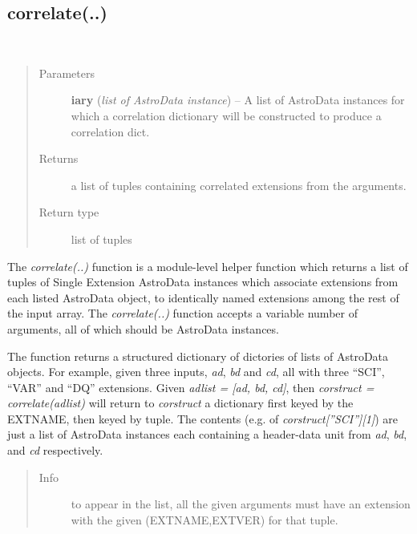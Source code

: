 \documentclass[letterpaper,10pt,english]{sphinxmanual}
\begin{document}
\subsection{correlate(..)}
\label{chapter_AstroDataClass:correlate}

\begin{fulllineitems}
\label{chapter_AstroDataClass:astrodata.data.correlate}~\begin{quote}\begin{description}
\item[{Parameters}] \leavevmode
\textbf{iary} (\emph{list of AstroData instance}) -- A list of AstroData instances for which a correlation dictionary
will be constructed to produce a correlation dict.

\item[{Returns}] \leavevmode
a list of tuples containing correlated extensions from the arguments.

\item[{Return type}] \leavevmode
list of tuples

\end{description}\end{quote}

The \emph{correlate(..)} function is a module-level helper function which returns
a list of tuples of Single Extension AstroData instances which associate
extensions from each listed AstroData object, to identically named
extensions among the rest of the input array. The \emph{correlate(..)} function
accepts a variable number of arguments, all of which should be AstroData
instances.

The function returns a structured dictionary of dictories of lists of
AstroData objects. For example, given three inputs, \emph{ad}, \emph{bd} and \emph{cd}, all
with three ``SCI'', ``VAR'' and ``DQ'' extensions. Given \emph{adlist = {[}ad, bd,
cd{]}}, then \emph{corstruct = correlate(adlist)} will return to \emph{corstruct} a
dictionary first keyed by the EXTNAME, then keyed by tuple. The contents
(e.g. of \emph{corstruct{[}''SCI''{]}{[}1{]}}) are just a list of AstroData instances each
containing a header-data unit from \emph{ad}, \emph{bd}, and \emph{cd} respectively.
\begin{quote}\begin{description}
\item[{Info }] \leavevmode
to appear in the list, all the given arguments must have an extension
with the given (EXTNAME,EXTVER) for that tuple.

\end{description}\end{quote}

\end{fulllineitems}
\end{document}
